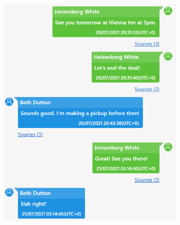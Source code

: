 \documentclass[12pt]{article}
\begin{document}
\begin{figure}[!ht]
    \centering
    \begin{subfigure}[b]{0.3\textwidth}
        \centering
        \includegraphics[width=\textwidth]{images/beth1.png}
        \caption{}
    \end{subfigure}
    \hspace{2 pt}
    \begin{subfigure}[b]{0.3\textwidth}
        \centering

\end{subfigure}
\end{figure}
\end{document}
